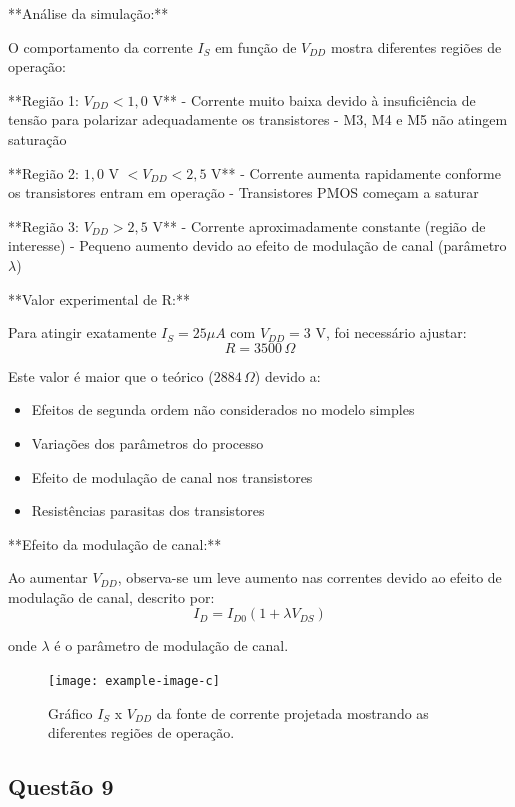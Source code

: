 \documentclass[12pt,a4paper]{article}
\begin{document}
**Análise da simulação:**

O comportamento da corrente $I_S$ em função de $V_{DD}$ mostra diferentes regiões de operação:

**Região 1: $V_{DD} < 1,0$ V**
- Corrente muito baixa devido à insuficiência de tensão para polarizar adequadamente os transistores
- M3, M4 e M5 não atingem saturação

**Região 2: $1,0$ V $< V_{DD} < 2,5$ V**
- Corrente aumenta rapidamente conforme os transistores entram em operação
- Transistores PMOS começam a saturar

**Região 3: $V_{DD} > 2,5$ V**
- Corrente aproximadamente constante (região de interesse)
- Pequeno aumento devido ao efeito de modulação de canal (parâmetro $\lambda$)

**Valor experimental de R:**

Para atingir exatamente $I_S = 25 \mu A$ com $V_{DD} = 3$ V, foi necessário ajustar:
$$R = 3500 \, \Omega$$

Este valor é maior que o teórico ($2884 \, \Omega$) devido a:
\begin{itemize}
    \item Efeitos de segunda ordem não considerados no modelo simples
    \item Variações dos parâmetros do processo
    \item Efeito de modulação de canal nos transistores
    \item Resistências parasitas dos transistores
\end{itemize}

**Efeito da modulação de canal:**

Ao aumentar $V_{DD}$, observa-se um leve aumento nas correntes devido ao efeito de modulação de canal, descrito por:
$$I_D = I_{D0}(1 + \lambda V_{DS}) $$

onde $\lambda$ é o parâmetro de modulação de canal.

\begin{figure}[H]
    \centering
    \texttt{[image: example-image-c]}
    \caption{Gráfico $I_S$ x $V_{DD}$ da fonte de corrente projetada mostrando as diferentes regiões de operação.}
    \label{fig:is_vdd}
\end{figure}

\subsection*{Questão 9}
\end{document}

